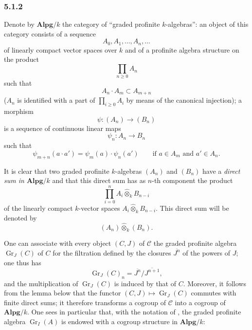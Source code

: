 
\subsubsection*{5.1.2}
\label{sga3:VIIB:5.1.2}

Denote by \(\mathbf{Alpg}/k\) the category of ``graded profinite
\(k\)-algebras'': an object of this category consists of a sequence
\[
  A_0,A_1,\ldots,A_n,\ldots
\]
of linearly compact vector spaces over \(k\) and of a profinite algebra
structure on the product
\[
  \prod_{n\geq0}A_n
\]
such that
\[
  A_n\cdot A_m\subset A_{m+n}
\]
\textup{(\(A_n\) is identified with a part of \(\prod_{i\geq0}A_i\) by
means of the canonical injection)}; a morphism
\[
  \psi:(A_n)\longrightarrow(B_n)
\]
is a sequence of continuous linear maps
\[
  \psi_n:A_n\longrightarrow B_n
\]
such that
\[
  \psi_{m+n}(a\cdot a')=\psi_m(a)\cdot\psi_n(a')
  \qquad\text{if }a\in A_m\text{ and }a'\in A_n.
\]

It is clear that two graded profinite \(k\)-algebras \((A_n)\) and
\((B_n)\) have a \emph{direct sum in \(\mathbf{Alpg}/k\)} and that this
direct sum has as \(n\)-th component the product
\[
  \prod_{i=0}^{n}
  A_i\widehat\otimes_k B_{n-i}
\]
of the linearly compact \(k\)-vector spaces
\(A_i\widehat\otimes_k B_{n-i}\). This direct sum will be denoted by
\[
  (A_n)\widehat\otimes_k(B_n).
\]

One can associate with every object \((C,J)\) of \(\mathcal C\) the
graded profinite algebra \(\operatorname{Gr}_J(C)\) of \(C\) for the
filtration defined by the closures \(\overline{J^n}\) of the powers of
\(J\); one thus has
\[
  \operatorname{Gr}_J(C)_n
  =
  \overline{J^n}/\overline{J^{n+1}},
\]
and the multiplication of \(\operatorname{Gr}_J(C)\) is induced by that of
\(C\). Moreover, it follows from the lemma below that the functor
\((C,J)\mapsto\operatorname{Gr}_J(C)\) commutes with finite direct sums;
it therefore transforms a cogroup of \(\mathcal C\) into a cogroup of
\(\mathbf{Alpg}/k\). One sees in particular that, with the notation of
, the graded profinite algebra \(\operatorname{Gr}_I(A)\) is
endowed with a cogroup structure in \(\mathbf{Alpg}/k\):

